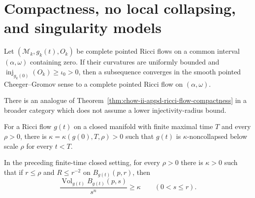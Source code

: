 \section{Compactness, no local collapsing, and singularity models}

\begin{theorem}
\label{thm:chow-ii-appd-ricci-flow-compactness}

Let $(\mathcal M_k,g_k(t),O_k)$ be complete pointed Ricci flows on a common
interval $(\alpha,\omega)$ containing zero. If their curvatures are uniformly
bounded and $\operatorname{inj}_{g_k(0)}(O_k)\geq\iota_0>0$, then a subsequence
converges in the smooth pointed Cheeger--Gromov sense to a complete pointed
Ricci flow on $(\alpha,\omega)$.
\end{theorem}

\begin{remark}
\label{rem:chow-ii-appd-compactness-without-injectivity}

There is an analogue of Theorem~\ref{thm:chow-ii-appd-ricci-flow-compactness}
in a broader category which does not assume a lower injectivity-radius bound.
\end{remark}

\begin{theorem}
\label{thm:chow-ii-appd-no-local-collapsing}

For a Ricci flow $g(t)$ on a closed manifold with finite maximal time $T$ and
every $\rho>0$, there is $\kappa=\kappa(g(0),T,\rho)>0$ such that $g(t)$ is
$\kappa$-noncollapsed below scale $\rho$ for every $t<T$.
\end{theorem}

\begin{theorem}
\label{thm:chow-ii-appd-improved-no-local-collapsing}


In the preceding finite-time closed setting, for every $\rho>0$ there is
$\kappa>0$ such that if $r\leq\rho$ and $R\leq r^{-2}$ on
$B_{g(t)}(p,r)$, then
\[
 \frac{\operatorname{Vol}_{g(t)}B_{g(t)}(p,s)}{s^n}\geq\kappa
 \qquad(0<s\leq r).
\]
\end{theorem}

